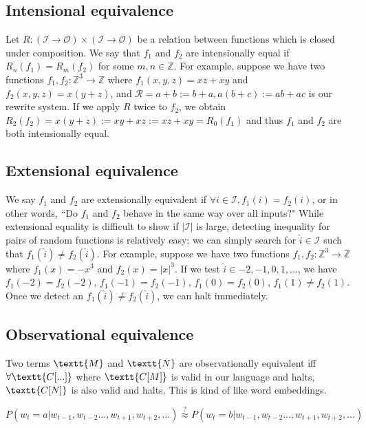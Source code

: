 \documentclass[11pt]{article}
\begin{document}
    \subsection{Intensional equivalence}\label{subsec:intensional-equivalence}

    Let $R: (\mathcal{I} \rightarrow \mathcal{O}) \times (\mathcal{I}\rightarrow \mathcal{O})$ be a relation between functions which is closed under composition. We say that $f_1$ and $f_2$ are intensionally equal if $R_n(f_1)=R_m(f_2)$ for some $m,n \in \mathbb{Z}$. For example, suppose we have two functions $f_1, f_2: \mathbb{Z}^3 \rightarrow \mathbb{Z}$ where $f_1(x, y, z)=xz + xy$ and $f_2(x, y, z)=x(y + z)$, and $\mathcal{R}={a + b := b + a, a(b + c) := ab + ac}$ is our rewrite system. If we apply $R$ twice to $f_2$, we obtain $R_2(f_2)=x(y + z):=xy + xz:=xz + xy=R_0(f_1)$ and thus $f_1$ and $f_2$ are both intensionally equal.

    \subsection{Extensional equivalence}\label{subsec:extensional-equivalence}

    We say $f_1$ and $f_2$ are extensionally equivalent if $\forall i \in \mathcal{I}, f_1(i)=f_2(i)$, or in other words, ``Do $f_1$ and $f_2$ behave in the same way over all inputs?" While extensional equality is difficult to show if $|\mathcal{I}|$ is large, detecting inequality for pairs of random functions is relatively easy: we can simply search for $\hat i \in \mathcal{I}$ such that $f_1(\hat i) \neq f_2(\hat i)$. For example, suppose we have two functions $f_1, f_2: \mathbb{Z}^3 \rightarrow \mathbb{Z}$ where $f_1(x)=-x^3$ and $f_2(x)=|x|^3$. If we test $\hat i \in {-2, -1, 0, 1, \ldots}$, we have $f_1(-2)=f_2(-2)$, $f_1(-1)=f_2(-1)$, $f_1(0)=f_2(0)$, $f_1(1) \neq f_2(1)$. Once we detect an $f_1(\hat i) \neq f_2(\hat i)$, we can halt immediately.

    \subsection{Observational equivalence}

    Two terms $\textt{M}$ and $\textt{N}$ are observationally equivalent iff $\forall \textt{C[...]}$ where $\textt{C[M]}$ is valid in our language and halts, $\textt{C[N]}$ is also valid and halts. This is kind of like word embeddings.

    $P(w_t = a | w_{t-1}, w_{t-2}\ldots, w_{t+1}, w_{t+2}, \ldots)\overset{?}{\approx} P(w_t = b | w_{t-1}, w_{t-2}\ldots, w_{t+1}, w_{t+2}, \ldots)$
\end{document}
